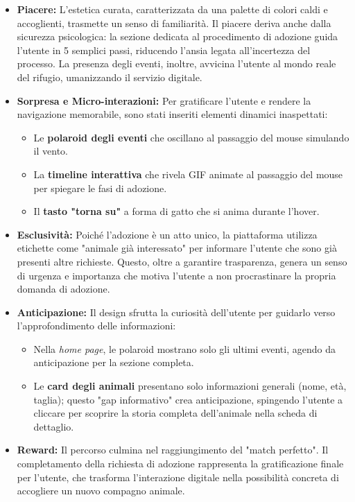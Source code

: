 \begin{itemize}
    \item \textbf{Piacere:} L'estetica curata, caratterizzata da una palette di colori caldi e accoglienti, trasmette un senso di familiarità. Il piacere deriva anche dalla sicurezza psicologica: la sezione dedicata al procedimento di adozione guida l'utente in 5 semplici passi, riducendo l'ansia legata all'incertezza del processo. La presenza degli eventi, inoltre, avvicina l'utente al mondo reale del rifugio, umanizzando il servizio digitale.
    
    \item \textbf{Sorpresa e Micro-interazioni:} Per gratificare l'utente e rendere la navigazione memorabile, sono stati inseriti elementi dinamici inaspettati:
    \begin{itemize}
        \item Le \textbf{polaroid degli eventi} che oscillano al passaggio del mouse simulando il vento.
        \item La \textbf{timeline interattiva} che rivela GIF animate al passaggio del mouse per spiegare le fasi di adozione.
        \item Il \textbf{tasto "torna su"} a forma di gatto che si anima durante l'hover. 
    \end{itemize}

    \item \textbf{Esclusività:} Poiché l'adozione è un atto unico, la piattaforma utilizza etichette come "animale già interessato" per informare l'utente che sono già presenti altre richieste. Questo, oltre a garantire trasparenza, genera un senso di urgenza e importanza che motiva l'utente a non procrastinare la propria domanda di adozione.

    \item \textbf{Anticipazione:} Il design sfrutta la curiosità dell'utente per guidarlo verso l'approfondimento delle informazioni:
    \begin{itemize}
        \item Nella \textit{home page}, le polaroid mostrano solo gli ultimi eventi, agendo da anticipazione per la sezione completa.
        \item Le \textbf{card degli animali} presentano solo informazioni generali (nome, età, taglia); questo "gap informativo" crea anticipazione, spingendo l'utente a cliccare per scoprire la storia completa dell'animale nella scheda di dettaglio.
    \end{itemize}

    \item \textbf{Reward:} Il percorso culmina nel raggiungimento del "match perfetto". Il completamento della richiesta di adozione rappresenta la gratificazione finale per l'utente, che trasforma l'interazione digitale nella possibilità concreta di accogliere un nuovo compagno animale.
\end{itemize}